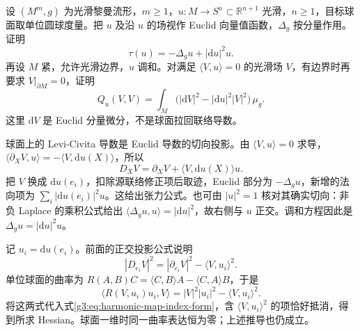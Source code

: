 \BookExercises
\begin{exercise}\label{g3:ex:sphere-map-tension-hessian}
	设 \((M^m,g)\) 为光滑黎曼流形，\(m\ge1\)，\(u:M\to S^n\subset\mathbb R^{n+1}\) 光滑，\(n\ge1\)，目标球面取单位圆球度量。把 \(u\) 及沿 \(u\) 的场视作 Euclid 向量值函数，\(\Delta_g\) 按分量作用。证明
	\[
		\tau(u)=-\Delta_gu+|\mathrm du|^2u.
	\]
	再设 \(M\) 紧，允许光滑边界，\(u\) 调和。对满足 \(\langle V,u\rangle=0\) 的光滑场 \(V\)，有边界时再要求 \(V|_{\partial M}=0\)，证明
	\[
		Q_u(V,V)=\int_M\bigl(|\mathrm dV|^2-|\mathrm du|^2|V|^2\bigr)\,\mu_g.
	\]
	这里 \(\mathrm dV\) 是 Euclid 分量微分，不是球面拉回联络导数。
\end{exercise}
\begin{solution}
	球面上的 Levi-Civita 导数是 Euclid 导数的切向投影。由 \(\langle V,u\rangle=0\) 求导，
	\(\langle\partial_XV,u\rangle=-\langle V,\mathrm du(X)\rangle\)，所以
	\[
		D_XV=\partial_XV+\langle V,\mathrm du(X)\rangle u.
	\]
	把 \(V\) 换成 \(\mathrm du(e_i)\)，扣除源联络修正项后取迹，Euclid 部分为 \(-\Delta_gu\)，新增的法向项为 \(\sum_i|\mathrm du(e_i)|^2u\)。这给出张力公式。也可由 \(|u|^2=1\) 核对其确实切向：非负 Laplace 的乘积公式给出 \(\langle\Delta_gu,u\rangle=|\mathrm du|^2\)，故右侧与 \(u\) 正交。调和方程因此是 \(\Delta_gu=|\mathrm du|^2u\)。

	记 \(u_i=\mathrm du(e_i)\)。前面的正交投影公式说明
	\[
		|D_{e_i}V|^2=|\partial_{e_i}V|^2-\langle V,u_i\rangle^2.
	\]
	单位球面的曲率为 \(R(A,B)C=\langle C,B\rangle A-\langle C,A\rangle B\)，于是
	\[
		\langle R(V,u_i)u_i,V\rangle
		=|V|^2|u_i|^2-\langle V,u_i\rangle^2.
	\]
	将这两式代入式\eqref{g3:eq:harmonic-map-index-form}，含 \(\langle V,u_i\rangle^2\) 的项恰好抵消，得到所求 Hessian。球面一维时同一曲率表达恒为零；上述推导也仍成立。
\end{solution}

